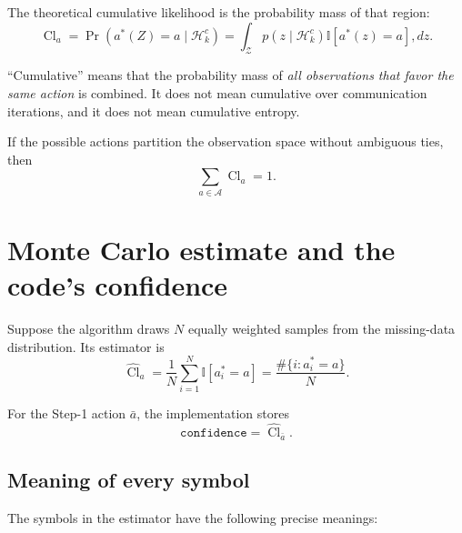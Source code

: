 \documentclass[11pt,a4paper]{article}
\newcommand{\Cl}{\operatorname{Cl}}
\newcommand{\I}{\mathbb{I}}
\begin{document}
The theoretical cumulative likelihood is the probability mass of that region:
\[
    \Cl_a
    = \Pr\!\left(a^*(Z)=a\mid\mathcal H_k^c\right)
    = \int_{\mathcal Z}
      p(z\mid\mathcal H_k^c)
      \I\!\left[a^*(z)=a\right],dz.
\]

``Cumulative'' means that the probability mass of \emph{all observations that
favor the same action} is combined.  It does not mean cumulative over
communication iterations, and it does not mean cumulative entropy.

If the possible actions partition the observation space without ambiguous
ties, then
\[
    \sum_{a\in\mathcal A}\Cl_a=1.
\]

\section{Monte Carlo estimate and the code's confidence}

Suppose the algorithm draws $N$ equally weighted samples from the missing-data
distribution.  Its estimator is
\[
    \widehat{\Cl}_a
    = \frac{1}{N}\sum_{i=1}^{N}\I[a_i^*=a]
    = \frac{\#\{i:a_i^*=a\}}{N}.
\]

For the Step-1 action $\bar a$, the implementation stores
\[
    \texttt{confidence}=\widehat{\Cl}_{\bar a}.
\]

\subsection*{Meaning of every symbol}

The symbols in the estimator have the following precise meanings:
\end{document}
